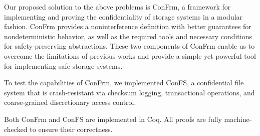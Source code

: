 Our proposed solution to the above problems is ConFrm, a framework for 
implementing and proving the confidentiality of storage systems in a modular fashion. ConFrm provides a noninterference definition with better guarantees for nondeterministic behavior, as well as the required tools and necessary conditions for safety-preserving abstractions. These two components of ConFrm enable us to overcome the limitations of previous works and provide a simple yet powerful tool for implementing safe storage systems.


To test the capabilities of ConFrm, we implemented ConFS, a confidential file system that is crash-resistant via checksum logging, transactional operations, and coarse-grained discretionary access control. 

Both ConFrm and ConFS are implemented in Coq. All proofs are fully machine-checked to ensure their correctness. 

